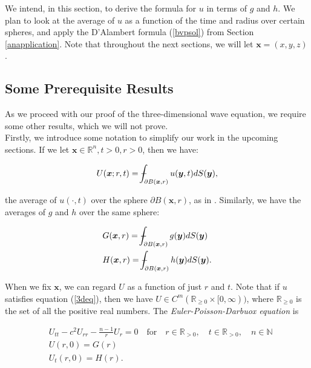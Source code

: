 \documentclass[a4paper, 12pt]{article}
\def\Xint#1{\mathchoice
{\XXint\displaystyle\textstyle{#1}}%
{\XXint\textstyle\scriptstyle{#1}}%
{\XXint\scriptstyle\scriptscriptstyle{#1}}%
{\XXint\scriptscriptstyle\scriptscriptstyle{#1}}%
\!\int}
\def\XXint#1#2#3{{\setbox0=\hbox{$#1{#2#3}{\int}$ }
\vcenter{\hbox{$#2#3$ }}\kern-.6\wd0}}
\def\dashint{\Xint-}
\numberwithin{equation}{section}
\begin{document}
We intend, in this section, to derive the formula for $u$ in terms of $g$ and
$h$. We plan to look at the average of $u$ as a function of the time and radius
over certain spheres, and apply the D'Alambert formula (\ref{bvpsol}) from
Section \ref{anapplication}. Note that throughout the next sections, we will let
$\boldsymbol{x}=(x,y,z)$.

\subsection{Some Prerequisite Results} \label{prereq}
As we proceed with our proof of the three-dimensional wave equation, we require
some other results, which we will not prove. \\

Firstly, we introduce some notation to simplify our work in the upcoming
sections. If we let $\boldsymbol{x}\in \mathbb{R}^n, t>0, r>0$, then we have:

\begin{equation} \label{averageU}
    U(\boldsymbol{x};r,t)=\dashint_{\partial B(\boldsymbol{x},r)}u(\boldsymbol{y},t)dS(\boldsymbol{y}),
\end{equation}

the average of $u(\cdot,t)$ over the sphere $\partial B(\boldsymbol{x},r)$, as
in \cite{Ev}. Similarly, we have the averages of $g$ and $h$ over the same
sphere:

\begin{equation} \label{averageGH}
    \begin{aligned}
        &G(\boldsymbol{x},r)=\dashint_{\partial B(\boldsymbol{x},r)}g(\boldsymbol{y})dS(\boldsymbol{y})\\
        &H(\boldsymbol{x},r)=\dashint_{\partial B(\boldsymbol{x},r)}h(\boldsymbol{y})dS(\boldsymbol{y}).
    \end{aligned}
\end{equation}

When we fix $\boldsymbol{x}$, we can regard $U$ as a function of just $r$ and
$t$. Note that if $u$ satisfies equation (\ref{3deq}), then we have $U \in
C^m(\mathbb{R}_{\ge 0}\times[0,\infty))$, where $\mathbb{R}_{\ge 0}$ is the set
of all the positive real numbers. The \emph{Euler-Poisson-Darbuox equation} is

\begin{equation} \label{EPDeq}
    \begin{aligned}
        &U_{tt}-c^2U_{rr}-\frac{n-1}{r}U_r=0 \quad \textrm {for} \quad r \in \mathbb{R}_{>0}, \quad t \in \mathbb{R}_{>0}, \quad n \in \mathbb{N}\\
        &U(r, 0)=G(r)\\
        &U_t(r,0)=H(r).
    \end{aligned}
\end{equation}
\end{document}
